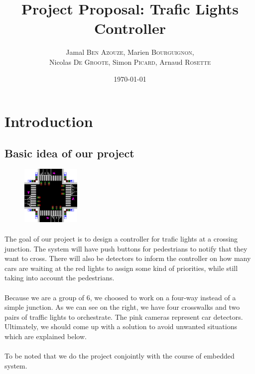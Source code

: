 \documentclass{article}
\title{Project Proposal: Trafic Lights Controller}
\author{Jamal \textsc{Ben Azouze}, Marien \textsc{Bourguignon},\\ Nicolas \textsc{De Groote}, Simon \textsc{Picard}, Arnaud \textsc{Rosette}} %
\date{\today} %
\begin{document}
\maketitle %


\section{Introduction}
\subsection{Basic idea of our project}
\begin{figure}
  \begin{center}
    \includegraphics[width=0.25\textwidth]{schema.png}
  \end{center}
\end{figure}
\paragraph{}
The goal of our project is to design a controller for trafic lights at a crossing junction. The system will have push buttons for pedestrians to notify that they want to cross.
There will also be detectors to inform the controller on how many cars are waiting at the red lights to assign some kind of priorities, while still taking into account the pedestrians.

\paragraph{}
Because we are a group of 6, we choosed to work on a four-way instead of a simple junction. As we can see on the right, we have four crosswalks and two pairs of traffic lights to orchestrate. The pink cameras represent car detectors. Ultimately, we should come up with a solution to avoid unwanted situations which are explained below.

\paragraph{}
To be noted that we do the project conjointly with the course of embedded system.\\ 
\end{document}
